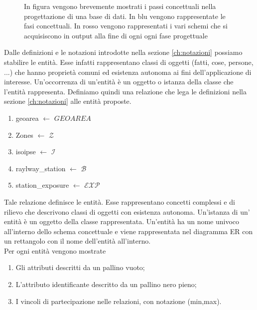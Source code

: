\begin{figure}[H]
	\centering
{}
\caption{In figura vengono brevemente mostrati i passi concettuali nella progettazione di una base di dati. In blu vengono rappresentate le fasi concettuali. In rosso vengono rappresentati i vari schemi che si acquisiscono in output alla fine di ogni ogni fase progettuale} 
\label{fig:diagrammaER}
\end{figure}

Dalle definizioni e le notazioni introdotte nella sezione \ref{ch:notazioni} possiamo 
stabilire le entità. Esse infatti rappresentano classi di oggetti (fatti, cose, persone, ...) che hanno proprietà comuni ed esistenza autonoma ai fini dell'applicazione di interesse. Un'occorrenza di un'entità è un oggetto o istanza della classe che l'entità rappresenta.
Definiamo quindi una relazione che lega le definizioni nella sezione \ref{ch:notazioni} alle entità proposte. 
\begin{enumerate}
	\item geoarea $\leftarrow$ $GEOAREA$
	\item Zones $\leftarrow$ $\mathcal{Z}$
	\item isoipse $\leftarrow$ $\mathcal{I}$
	\item raylway\_station $\leftarrow$ $\mathcal{B}$
	\item station\_exposure $\leftarrow$ $\mathcal{EXP}$

\end{enumerate}
Tale relazione definisce le entità. Esse rappresentano concetti complessi e di rilievo che descrivono classi di oggetti con esistenza autonoma. Un'istanza di un' entità è un oggetto della classe rappresentata. Un'entità ha un nome univoco all'interno dello schema concettuale e viene rappresentata nel diagramma ER con un rettangolo con il nome dell'entità all'interno. \\
Per ogni entità vengono mostrate
\begin{enumerate}
	\item Gli attributi descritti da un pallino vuoto;
	\item L'attributo identificante descritto da un pallino nero pieno;
	\item I vincoli di partecipazione nelle relazioni, con notazione (min,max).
\end{enumerate}





